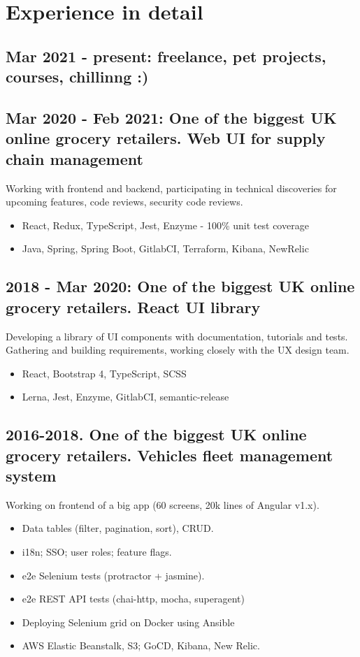 \documentclass[a4paper, 14pt]{article}
\begin{document}
\section{Experience in detail}
  \subsection{Mar 2021 - present: freelance, pet projects, courses, chillinng :)}
  \subsection{Mar 2020 - Feb 2021: One of the biggest UK online grocery retailers. Web UI for supply chain management}
  Working with frontend and backend, participating in technical discoveries for upcoming features, code reviews, security code reviews.
    \begin{itemize}
      \item React, Redux, TypeScript, Jest, Enzyme - 100\% unit test coverage \\
      \item Java, Spring, Spring Boot, GitlabCI, Terraform, Kibana, NewRelic
    \end{itemize}
  \subsection{2018 - Mar 2020: One of the biggest UK online grocery retailers. React UI library}
    Developing a library of UI components with documentation, tutorials and tests. \\
    Gathering and building requirements, working closely with the UX design team.
    \begin{itemize}
      \item React, Bootstrap 4, TypeScript, SCSS \\ 
      \item Lerna, Jest, Enzyme, GitlabCI, semantic-release
    \end{itemize}
  \subsection{2016-2018. One of the biggest UK online grocery retailers. Vehicles fleet management system}
    Working on frontend of a big app (60 screens, 20k lines of Angular v1.x).
    \begin{itemize}
      \item Data tables (filter, pagination, sort), CRUD. \\
      \item i18n; SSO; user roles; feature flags. \\
      \item e2e Selenium tests (protractor + jasmine). \\
      \item e2e REST API tests (chai-http, mocha, superagent) \\
      \item Deploying Selenium grid on Docker using Ansible \\
      \item AWS Elastic Beanstalk, S3; GoCD, Kibana, New Relic.
    \end{itemize}
\end{document}
